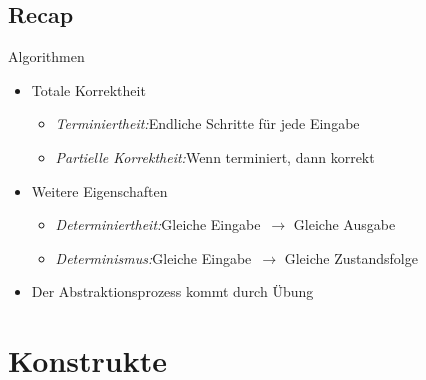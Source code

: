 \subsection{Recap}
\begin{frame}[c]{\hfill Algorithmen}
\begin{itemize}[<+(1)->]
   \itemsep14pt
   \item Totale Korrektheit \begin{itemize}
      \item \textit{Terminiertheit:}\hfill Endliche Schritte für jede Eingabe
      \item \textit{Partielle Korrektheit:}\hfill Wenn terminiert, dann korrekt
   \end{itemize}
   \item Weitere Eigenschaften \begin{itemize}
      \item \textit{Determiniertheit:}\hfill Gleiche Eingabe~\(\to\) Gleiche Ausgabe
      \item \textit{Determinismus:}\hfill Gleiche Eingabe~\(\to\) Gleiche Zustandsfolge
   \end{itemize}
   \item Der Abstraktionsprozess kommt durch Übung
\end{itemize}
\LargeSide
\end{frame}


\section{Konstrukte}
